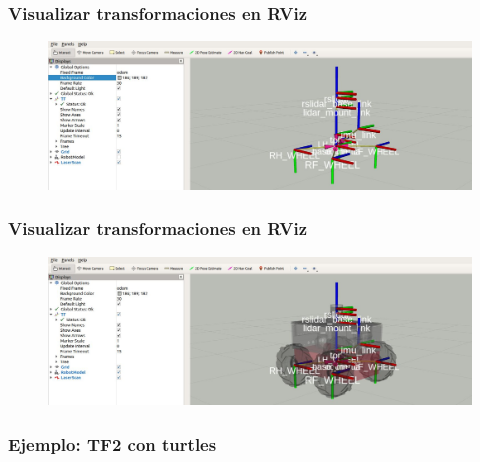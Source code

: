 \begin{frame}
	\frametitle{Visualizar transformaciones en RViz}
	
   	\begin{figure}[!h]
		\centering
			\includegraphics[width=\columnwidth]{images/tf2_tree_rviz.png}
	\end{figure}
	
\end{frame}

\begin{frame}
	\frametitle{Visualizar transformaciones en RViz}
	\begin{figure}[!h]
		\centering
		\includegraphics[width=\columnwidth]{images/tf2_tree_robot_rviz.png}
	\end{figure}
	
\end{frame}

\begin{frame}
	\frametitle{Ejemplo: TF2 con turtles}
	
	
	
\end{frame}


